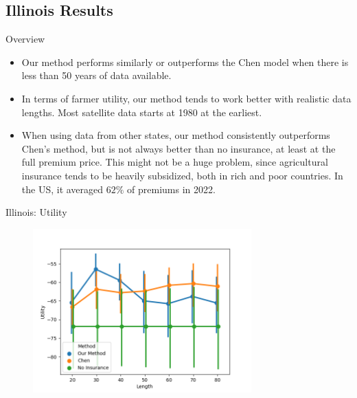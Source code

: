\documentclass{beamer}
\begin{document}
\subsection*{Illinois Results}
\begin{frame}{Overview}
    \begin{itemize}
        \setlength\itemsep{2em}
        \item Our method performs similarly or outperforms the Chen model when there is less than 50 years of data available.  
        \item In terms of farmer utility, our method tends to work better with realistic data lengths. Most satellite data starts at 1980 at the earliest. 
        \item When using data from other states, our method consistently outperforms Chen's method, but is not always better than no insurance, at least at the full premium price. This might not be a huge problem, since agricultural insurance tends to be heavily subsidized, both in rich and poor countries. In the US, it averaged $62\%$ of premiums in 2022. 
    \end{itemize}
\end{frame}

\begin{frame}{Illinois: Utility}
    \begin{figure}
        \includegraphics[width=0.75\textwidth]{../../../output/figures/Evaluation/Illinois_Average_Utility_CI.png}
    \end{figure}
\end{frame}

\end{document}
